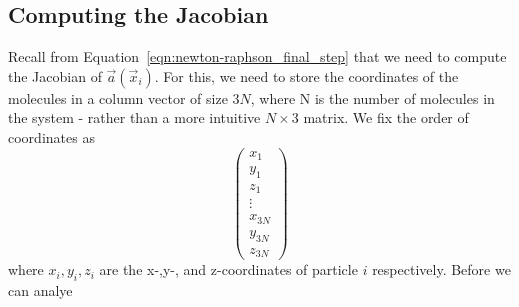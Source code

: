 \documentclass[../Main.tex]{subfiles}
\begin{document}
\subsection{Computing the Jacobian}

Recall from Equation~\ref{eqn:newton-raphson_final_step} that we need to compute the Jacobian of $\vec{a}\left(\vec{x}_{i}\right)$. For this, we need to store the coordinates of the molecules in a column vector of size $3N$, where N is the number of molecules in the system - rather than a more intuitive $N \times 3$ matrix. We fix the order of coordinates as
$$
\begin{pmatrix}
	x_{1} \\ y_{1} \\ z_{1} \\
	\vdots \\
	x_{3N} \\ y_{3N} \\ z_{3N}
\end{pmatrix}  
$$ where $x_{i}, y_{i}, z_{i}$ are the x-,y-, and z-coordinates of particle $i$ respectively.
Before we can analye
\end{document}
